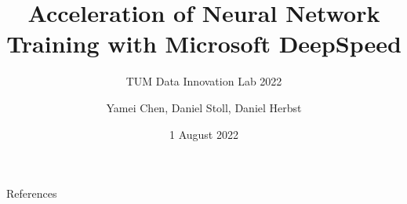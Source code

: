 \documentclass[12pt, aspectratio=169]{beamer}
\title{Acceleration of Neural Network Training with Microsoft DeepSpeed}
\subtitle{TUM Data Innovation Lab 2022}
\author{Yamei Chen, Daniel Stoll, Daniel Herbst}
\date{1 August 2022}
\begin{document}
	
	\begin{frame}[plain]
		\maketitle
	\end{frame}

	\begin{frame}
		\tableofcontents
	\end{frame}

	
	
	
	
	

	\begin{frame}[allowframebreaks]{References}
		\AtNextBibliography{\scriptsize}
		\printbibliography[heading=none]
	\end{frame}
\end{document}
